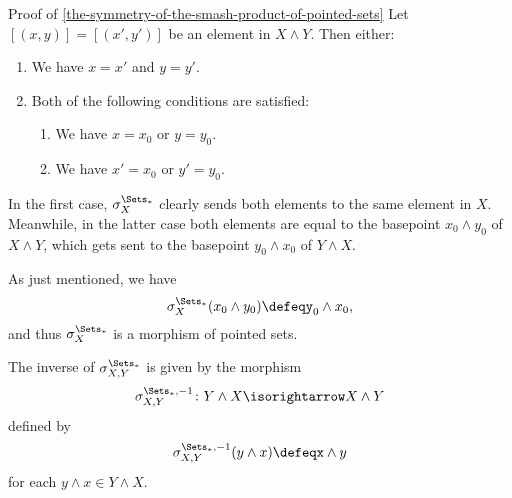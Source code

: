 \begin{Proof}{Proof of \cref{the-symmetry-of-the-smash-product-of-pointed-sets}}%
    Let $[(x,y)]=[(x',y')]$ be an element in $X\wedge Y$. Then either:
    \begin{enumerate}
        \item\label{proof-of-the-symmetry-of-the-smash-product-of-pointed-sets-1}We have $x=x'$ and $y=y'$.
        \item\label{proof-of-the-symmetry-of-the-smash-product-of-pointed-sets-2}Both of the following conditions are satisfied:
            \begin{enumerate}
                \item\label{proof-of-the-symmetry-of-the-smash-product-of-pointed-sets-2-a}We have $x=x_{0}$ or $y=y_{0}$.
                \item\label{proof-of-the-symmetry-of-the-smash-product-of-pointed-sets-2-b}We have $x'=x_{0}$ or $y'=y_{0}$.
            \end{enumerate}
    \end{enumerate}
    In the first case, $\sigma^{\Sets_{*}}_{X}$ clearly sends both elements to the same element in $X$. Meanwhile, in the latter case both elements are equal to the basepoint $x_{0}\wedge y_{0}$ of $X\wedge Y$, which gets sent to the basepoint $y_{0}\wedge x_{0}$ of $Y\wedge X$.

    As just mentioned, we have
    \[
        \sigma^{\Sets_{*}}_{X}(x_{0}\wedge y_{0})%
        \defeq%
        y_{0}\wedge x_{0},%
    \]%
    and thus $\sigma^{\Sets_{*}}_{X}$ is a morphism of pointed sets.

    The inverse of $\sigma^{\Sets_{*}}_{X,Y}$ is given by the morphism
    \[
        \sigma^{\Sets_{*},-1}_{X,Y}
        \colon
        Y\wedge X
        \isorightarrow
        X\wedge Y
    \]%
    defined by
    \[
        \sigma^{\Sets_{*},-1}_{X,Y}(y\wedge x)%
        \defeq%
        x\wedge y
    \]%
    for each $y\wedge x\in Y\wedge X$.


\end{Proof}
